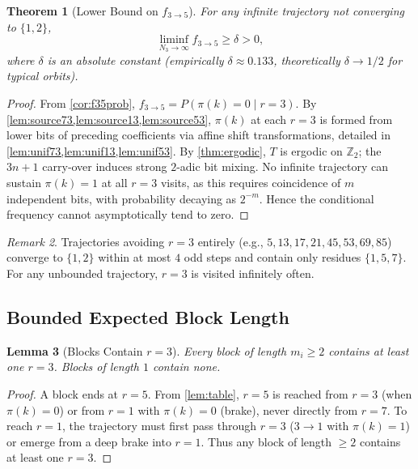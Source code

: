 \documentclass[12pt,a4paper]{article}
\newtheorem{theorem}{Theorem}[section]
\newtheorem{lemma}[theorem]{Lemma}
\theoremstyle{definition}
\theoremstyle{remark}
\newtheorem{remark}[theorem]{Remark}
\let\oldliminf\liminf
\renewcommand{\liminf}{\oldliminf\limits}
\begin{document}
\begin{theorem}[Lower Bound on $f_{3\to5}$]\label{thm:f35bound}
For any infinite trajectory not converging to $\{1,2\}$,
\[
\liminf_{N_3\to\infty}f_{3\to5}\ge\delta>0,
\]
where $\delta$ is an absolute constant (empirically $\delta\approx0.133$,
theoretically $\delta\to1/2$ for typical orbits).
\end{theorem}

\begin{proof}
From \cref{cor:f35prob}, $f_{3\to5}=P(\pi(k)=0\mid r=3)$.
By \cref{lem:source73,lem:source13,lem:source53}, $\pi(k)$ at each
$r=3$ is formed from lower bits of preceding coefficients via affine
shift transformations, detailed in
\cref{lem:unif73,lem:unif13,lem:unif53}.
By \cref{thm:ergodic}, $T$ is ergodic on $\mathbb Z_2$; the $3n+1$
carry‑over induces strong $2$-adic bit mixing.
No infinite trajectory can sustain $\pi(k)=1$ at all $r=3$ visits, as
this requires coincidence of $m$ independent bits, with probability
decaying as $2^{-m}$.
Hence the conditional frequency cannot asymptotically tend to zero.
\end{proof}

\begin{remark}\label{rem:noR3}
Trajectories avoiding $r=3$ entirely (e.g., $5,13,17,21,45,53,69,85$)
converge to $\{1,2\}$ within at most $4$ odd steps and contain only
residues $\{1,5,7\}$.
For any unbounded trajectory, $r=3$ is visited infinitely often.
\end{remark}

\subsection{Bounded Expected Block Length}

\begin{lemma}[Blocks Contain $r=3$]\label{lem:blockscontainR3}
Every block of length $m_i\ge2$ contains at least one $r=3$.
Blocks of length $1$ contain none.
\end{lemma}

\begin{proof}
A block ends at $r=5$.
From \cref{lem:table}, $r=5$ is reached from $r=3$ (when $\pi(k)=0$)
or from $r=1$ with $\pi(k)=0$ (brake), never directly from $r=7$.
To reach $r=1$, the trajectory must first pass through $r=3$
($3\to1$ with $\pi(k)=1$) or emerge from a deep brake into $r=1$.
Thus any block of length $\ge2$ contains at least one $r=3$.
\end{proof}
\end{document}

